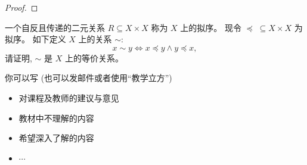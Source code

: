 \documentclass[a4paper, justified]{tufte-handout}
\begin{document}
\begin{proof}
\end{proof}

\begin{problem}
  一个自反且传递的二元关系 $R \subseteq X \times X$
  称为 $X$ 上的拟序。
  现令 $\preceq\; \subseteq X \times X$ 为拟序。
  如下定义 $X$ 上的关系 $\sim$:
  \[
    x \sim y \iff x \preceq y \land y \preceq x,
  \]
  请证明, $\sim$ 是 $X$ 上的等价关系。
\end{problem}

\begin{solution}
\end{solution}

\begincorrection

\beginfb

你可以写 (也可以发邮件或者使用``教学立方'')
\begin{itemize}
  \item 对课程及教师的建议与意见
  \item 教材中不理解的内容
  \item 希望深入了解的内容
  \item $\cdots$
\end{itemize}
\end{document}
